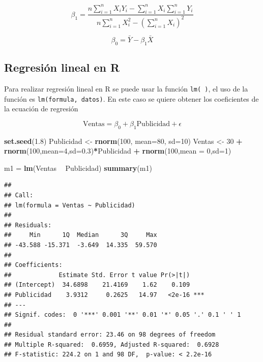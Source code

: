 \documentclass[letterpaper,]{book}
\newenvironment{Shaded}{\begin{snugshade}}{\end{snugshade}}
\newcommand{\DataTypeTok}[1]{\textcolor[rgb]{0.13,0.29,0.53}{#1}}
\newcommand{\DecValTok}[1]{\textcolor[rgb]{0.00,0.00,0.81}{#1}}
\newcommand{\FloatTok}[1]{\textcolor[rgb]{0.00,0.00,0.81}{#1}}
\newcommand{\KeywordTok}[1]{\textcolor[rgb]{0.13,0.29,0.53}{\textbf{#1}}}
\newcommand{\NormalTok}[1]{#1}
\newcommand{\OperatorTok}[1]{\textcolor[rgb]{0.81,0.36,0.00}{\textbf{#1}}}
\newcommand{\StringTok}[1]{\textcolor[rgb]{0.31,0.60,0.02}{#1}}
\begin{document}
\begin{equation}
\beta_1 = \dfrac{n\sum_{i=1}^{n}{X_iY_i}-\sum_{i=1}^{n}{X_i}\sum_{i=1}^{n}{Y_i}}{n\sum_{i=1}^{n}{X_i^2}-\left(\sum_{i=1}^{n}{X_i}\right)^2}
    \label{eq:pendiente}
\end{equation}

\begin{equation}
\beta_0 = \bar{Y}-\beta_1\bar{X}
    \label{eq:inter}
\end{equation}

\hypertarget{regresion-lineal-en-r}{%
\subsection{Regresión lineal en R}\label{regresion-lineal-en-r}}

Para realizar regresión lineal en R se puede usar la función \texttt{lm(\ )}, el uso de la función es \texttt{lm(formula,\ datos)}. En este caso se quiere obtener los coeficientes de la ecuación de regresión

\begin{equation}
  \text{Ventas} = \beta_0 + \beta_1 \text{Publicidad} + \epsilon
    \label{eq:modelo0}
\end{equation}

\begin{Shaded}
\begin{Highlighting}[]
\KeywordTok{set.seed}\NormalTok{(}\FloatTok{1.8}\NormalTok{)}
\NormalTok{Publicidad <-}\StringTok{ }\KeywordTok{rnorm}\NormalTok{(}\DecValTok{100}\NormalTok{, }\DataTypeTok{mean=}\DecValTok{80}\NormalTok{, }\DataTypeTok{sd=}\DecValTok{10}\NormalTok{)}
\NormalTok{Ventas <-}\StringTok{ }\DecValTok{30} \OperatorTok{+}\StringTok{ }\KeywordTok{rnorm}\NormalTok{(}\DecValTok{100}\NormalTok{,}\DataTypeTok{mean=}\DecValTok{4}\NormalTok{,}\DataTypeTok{sd=}\FloatTok{0.3}\NormalTok{)}\OperatorTok{*}\NormalTok{Publicidad }\OperatorTok{+}\StringTok{ }\KeywordTok{rnorm}\NormalTok{(}\DecValTok{100}\NormalTok{,}\DataTypeTok{mean =} \DecValTok{0}\NormalTok{,}\DataTypeTok{sd=}\DecValTok{1}\NormalTok{)}

\NormalTok{m1 =}\StringTok{ }\KeywordTok{lm}\NormalTok{(Ventas }\OperatorTok{~}\StringTok{ }\NormalTok{Publicidad)}
\KeywordTok{summary}\NormalTok{(m1)}
\end{Highlighting}
\end{Shaded}

\begin{verbatim}
## 
## Call:
## lm(formula = Ventas ~ Publicidad)
## 
## Residuals:
##     Min      1Q  Median      3Q     Max 
## -43.588 -15.371  -3.649  14.335  59.570 
## 
## Coefficients:
##             Estimate Std. Error t value Pr(>|t|)    
## (Intercept)  34.6898    21.4169    1.62    0.109    
## Publicidad    3.9312     0.2625   14.97   <2e-16 ***
## ---
## Signif. codes:  0 '***' 0.001 '**' 0.01 '*' 0.05 '.' 0.1 ' ' 1
## 
## Residual standard error: 23.46 on 98 degrees of freedom
## Multiple R-squared:  0.6959, Adjusted R-squared:  0.6928 
## F-statistic: 224.2 on 1 and 98 DF,  p-value: < 2.2e-16
\end{verbatim}
\end{document}
